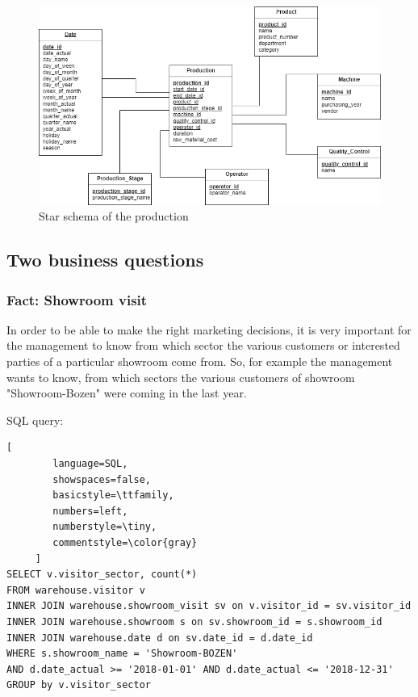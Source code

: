 \documentclass[letterpaper,12pt]{article}
\begin{document}
\begin{figure}[H] 
        \centering
        \includegraphics[width=\columnwidth]{../images/Starschema_Production.png}
        \caption{
                \label{fig:starschemaProduction}  
                Star schema of the production
        }
\end{figure}

\subsection{Two business questions}

\subsubsection{Fact: Showroom visit}

In order to be able to make the right marketing decisions, it is very important for the management to know from which sector the various customers or interested parties of a particular showroom come from. So, for example the management wants to know, from which sectors the various customers of showroom "Showroom-Bozen" were coming in the last year.

\bigskip
\noindent SQL query:
\begin{lstlisting}[
        language=SQL,
        showspaces=false,
        basicstyle=\ttfamily,
        numbers=left,
        numberstyle=\tiny,
        commentstyle=\color{gray}
     ]
SELECT v.visitor_sector, count(*)
FROM warehouse.visitor v
INNER JOIN warehouse.showroom_visit sv on v.visitor_id = sv.visitor_id
INNER JOIN warehouse.showroom s on sv.showroom_id = s.showroom_id
INNER JOIN warehouse.date d on sv.date_id = d.date_id
WHERE s.showroom_name = 'Showroom-BOZEN' 
AND d.date_actual >= '2018-01-01' AND d.date_actual <= '2018-12-31'
GROUP by v.visitor_sector
\end{lstlisting}
\end{document}
